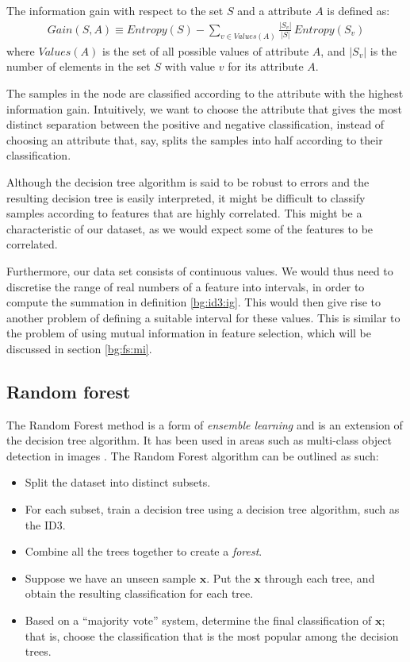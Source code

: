 \documentclass[12pt, twoside, a4paper]{report}
\begin{document}
\begin{mydef}
The information gain with respect to the set $S$ and a attribute $A$ is defined as:
\begin{align*}
Gain(S, A) \equiv Entropy(S) - \sum_{v \in Values(A)} \frac{|S_v|}{|S|} \, Entropy(S_v)
\end{align*}
where $Values(A)$ is the set of all possible values of attribute $A$, and $|S_v|$ is the number of elements in the set $S$ with value $v$ for its attribute $A$.
\label{bg:id3:ig}
\end{mydef}

The samples in the node are classified according to the attribute with the highest information gain. Intuitively, we want to choose the attribute that gives the most distinct separation between the positive and negative classification, instead of choosing an attribute that, say, splits the samples into half according to their classification.

Although the decision tree algorithm is said to be robust to errors \cite{RefWorks:98} and the resulting decision tree is easily interpreted, it might be difficult to classify samples according to features that are highly correlated. This might be a characteristic of our dataset, as we would expect some of the features to be correlated.

Furthermore, our data set consists of continuous values. We would thus need to discretise the range of real numbers of a feature into intervals, in order to compute the summation in definition \ref{bg:id3:ig}. This would then give rise to another problem of defining a suitable interval for these values. This is similar to the problem of using mutual information in feature selection, which will be discussed in section \ref{bg:fs:mi}.

\subsection{Random forest}
The Random Forest method \cite{RefWorks:101} is a form of \textit{ensemble learning} and is an extension of the decision tree algorithm. It has been used in areas such as multi-class object detection in images \cite{RefWorks:100}. The Random Forest algorithm can be outlined as such:
\begin{itemize}
\item Split the dataset into distinct subsets.
\item For each subset, train a decision tree using a decision tree algorithm, such as the ID3.
\item Combine all the trees together to create a \textit{forest}.
\item Suppose we have an unseen sample $\boldsymbol x$.  Put the $\boldsymbol x$ through each tree, and obtain the resulting classification for each tree.
\item Based on a ``majority vote'' system, determine the final classification of $\boldsymbol x$; that is, choose the classification that is the most popular among the decision trees.
\end{itemize}
\end{document}
